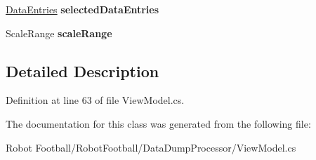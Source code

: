 \begin{DoxyCompactItemize}
\item 
\hypertarget{class_data_dump_processor_1_1_view_model_a923397a980c98aa6f4e557f4635cd2d7}{\hyperlink{class_data_dump_processor_1_1_data_entries}{Data\-Entries} {\bfseries selected\-Data\-Entries}}\label{class_data_dump_processor_1_1_view_model_a923397a980c98aa6f4e557f4635cd2d7}

\item 
\hypertarget{class_data_dump_processor_1_1_view_model_ac47462fe0944c9260e15f5615ebc5529}{Scale\-Range {\bfseries scale\-Range}}\label{class_data_dump_processor_1_1_view_model_ac47462fe0944c9260e15f5615ebc5529}

\end{DoxyCompactItemize}


\subsection{Detailed Description}


Definition at line 63 of file View\-Model.\-cs.



The documentation for this class was generated from the following file\-:\begin{DoxyCompactItemize}
\item 
Robot Football/\-Robot\-Football/\-Data\-Dump\-Processor/View\-Model.\-cs\end{DoxyCompactItemize}
